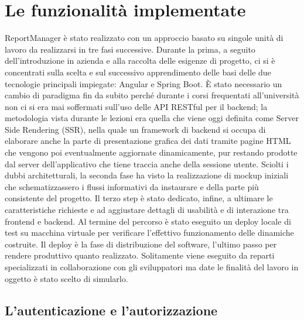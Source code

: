 \chapter{Le funzionalità implementate}\label{c:functionalities}

ReportManager è stato realizzato con un approccio basato su singole unità di lavoro da realizzarsi in tre fasi successive.
Durante la prima, a seguito dell'introduzione in azienda e alla raccolta delle esigenze di progetto, ci si è concentrati sulla scelta e sul successivo apprendimento delle basi
delle due tecnologie principali impiegate: Angular e Spring Boot.
È stato necessario un cambio di paradigma fin da subito perché durante i corsi frequentati all'università non ci si era mai soffermati sull'uso delle API RESTful per il
backend; la metodologia vista durante le lezioni era quella che viene oggi definita come Server Side Rendering (SSR), nella quale un framework di backend si occupa
di elaborare anche la parte di presentazione grafica dei dati tramite pagine HTML che vengono poi eventualmente aggiornate dinamicamente, pur restando prodotte
dal server dell'applicativo che tiene traccia anche della sessione utente.
Sciolti i dubbi architetturali, la seconda fase ha visto la realizzazione di mockup iniziali che schematizzassero i flussi informativi da instaurare e della parte più consistente
del progetto.
Il terzo step è stato dedicato, infine, a ultimare le caratteristiche richieste e ad aggiustare dettagli di usabilità e di interazione tra frontend e backend.
Al termine del percorso è stato eseguito un deploy locale di test su macchina virtuale per verificare l'effettivo funzionamento delle dinamiche costruite.
Il deploy è la fase di distribuzione del software, l'ultimo passo per rendere produttivo quanto realizzato.
Solitamente viene eseguito da reparti specializzati in collaborazione con gli sviluppatori ma date le finalità del lavoro in oggetto è stato scelto di simularlo.

\section{L'autenticazione e l'autorizzazione}

